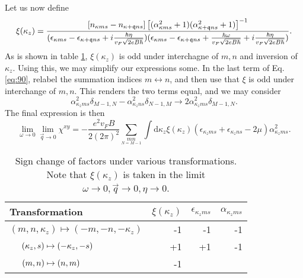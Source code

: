Let us now define
\begin{equation}
  \xi(\kappa_z) = \frac{[n_{\kappa ms} - n_{\kappa + \mathfrak{q} ns}]
  \left[ (\alpha_{\kappa ms}^2 + 1) (\alpha_{\kappa +\mathfrak{q} ns}^2 + 1) \right]^{-1}
  }{
    (\epsilon _{\kappa m s} - \epsilon _{\kappa +\mathfrak{q}ns} + i \frac{\hbar  \eta }{v_F\sqrt{2 e B \hbar }})
    (\epsilon _{\kappa m s} - \epsilon _{\kappa +\mathfrak{q}ns} + \frac{\hbar \omega }{v_F \sqrt{2 e B \hbar }} + i \frac{\hbar  \eta }{v_F\sqrt{2 e B \hbar }})
  }.
\end{equation}
As is shown in table \ref{tab:transform-sign}, \( \xi(\kappa_z) \) is odd under interchagne of \( m,n \) and inversion of \( \kappa_z \).
Using this, we may simplify our expressions some.
In the last term of Eq. \eqref{eq:90}, relabel the summation indices \( m \leftrightarrow n \), and then use that \( \xi \) is odd under interchange of \( m,n \).
This renders the two terms equal, and we may consider
\[
\alpha_{\kappa_z m s}^2 \delta_{M-1,N} - \alpha_{\kappa_z n s}^2 \delta_{N-1, M} \to 2 \alpha_{\kappa_z m s}^2 \delta_{M-1, N}.
\]
The final expression is then
\begin{equation}
  \label{eq:91}
  \lim_{\omega \to 0} \lim_{\vec{q} \to 0} \chi^{xy} =
  -\frac{e^2 v_F B}{2 (2 \pi)^2} \sum\limits_{\underset{N=M-1}{mn}}
  \int \mathrm{d}\kappa_z \xi(\kappa_z)
  (\epsilon_{\kappa_z m s} + \epsilon_{\kappa_z n s} - 2 \mu) \alpha_{\kappa_z m s}^2.
\end{equation}

\begin{table}[ht]
  \centering
  \begin{tabular}{l r r r}
    \toprule
    Transformation & \( \xi(\kappa_z) \) & \( \epsilon_{\kappa_z m s} \) & \( \alpha_{\kappa_z m s} \)\\
    \midrule
    \( (m, n, \kappa_z) \mapsto (-m, -n, -\kappa_z) \) & -1 & -1 & -1\\
    \( \hphantom{(m, n, \kappa_z)}\mathllap{(\kappa_z, s)} \mapsto (-\kappa_z, -s) \) & +1 & +1 & -1\\
    \(  \hphantom{(m, n, \kappa_z)}\mathllap{ (m, n)} \mapsto (n, m)\) & -1 &&\\
    \bottomrule
  \end{tabular}
  \caption{Sign change of factors under various transformations. Note that \( \xi(\kappa_z) \) is taken in the limit \( \omega\to0, \vec{q}\to 0, \eta\to 0 \). \label{tab:transform-sign}}
\end{table}

